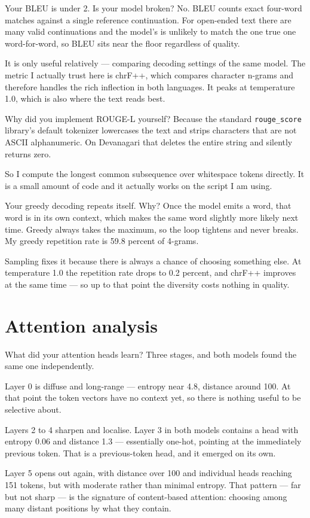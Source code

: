 \documentclass[11pt]{report}
\newcommand{\p}[1]{\texttt{#1}}
\begin{document}
\begin{qabox}{Your BLEU is under 2. Is your model broken?}
No. BLEU counts exact four-word matches against a single reference continuation.
For open-ended text there are many valid continuations and the model's is unlikely
to match the one true one word-for-word, so BLEU sits near the floor regardless of
quality.

It is only useful relatively --- comparing decoding settings of the same model.
The metric I actually trust here is chrF++, which compares character n-grams and
therefore handles the rich inflection in both languages. It peaks at temperature
1.0, which is also where the text reads best.
\end{qabox}

\begin{qabox}{Why did you implement ROUGE-L yourself?}
Because the standard \p{rouge\_score} library's default tokenizer lowercases the
text and strips characters that are not ASCII alphanumeric. On Devanagari that
deletes the entire string and silently returns zero.

So I compute the longest common subsequence over whitespace tokens directly. It is
a small amount of code and it actually works on the script I am using.
\end{qabox}

\begin{qabox}{Your greedy decoding repeats itself. Why?}
Once the model emits a word, that word is in its own context, which makes the same
word slightly more likely next time. Greedy always takes the maximum, so the loop
tightens and never breaks. My greedy repetition rate is 59.8 percent of 4-grams.

Sampling fixes it because there is always a chance of choosing something else. At
temperature 1.0 the repetition rate drops to 0.2 percent, and chrF++ improves at
the same time --- so up to that point the diversity costs nothing in quality.
\end{qabox}

\section{Attention analysis}

\begin{qabox}{What did your attention heads learn?}
Three stages, and both models found the same one independently.

Layer 0 is diffuse and long-range --- entropy near 4.8, distance around 100. At
that point the token vectors have no context yet, so there is nothing useful to be
selective about.

Layers 2 to 4 sharpen and localise. Layer 3 in both models contains a head with
entropy 0.06 and distance 1.3 --- essentially one-hot, pointing at the immediately
previous token. That is a previous-token head, and it emerged on its own.

Layer 5 opens out again, with distance over 100 and individual heads reaching 151
tokens, but with moderate rather than minimal entropy. That pattern --- far but not
sharp --- is the signature of content-based attention: choosing among many distant
positions by what they contain.
\end{qabox}
\end{document}
